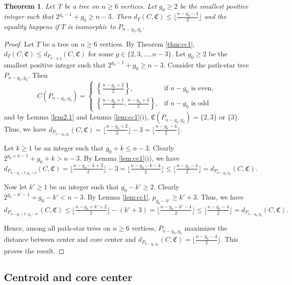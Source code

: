 \documentclass[11pt]{article}
\newtheorem{theorem}{Theorem}[section]
\begin{document}
\begin{theorem}\label{thm:cc2}
Let T be a tree on $n\geq 6$ vertices. Let $g_0\geq 2$ be the smallest positive integer such that $2^{g_0-1}+g_0\geq n-3$. Then  $d_T(C,\mathfrak{C})\leq \lfloor \frac{n-g_0-4}{2} \rfloor$ and the equality happens if $T$ is isomorphic to $P_{n-g_0,g_0}$.
\end{theorem}
\begin{proof}
Let $T$ be a tree on $n\geq 6$ vertices. By Theorem \ref{thm:cc1}, $d_T(C,\mathfrak{C})\leq d_{P_{n-g,g}}(C,\mathfrak{C})$ for some $g\in \{2,3,\ldots,n-3\}$.  
Let $g_0\geq 2$ be the smallest positive integer such that $2^{g_0-1}+g_0\geq n-3$. Consider the path-star tree $P_{n-g_0,g_0}$. Then 
\begin{equation*}
C(P_{n - g_0, g_0}) =
\begin{cases}
\left\{\frac{n - g_0 + 2}{2}\right\}, &\text{if $n - g_0$ is even,}\\
\left\{\frac{n - g_0 + 1}{2}, \frac{n - g_0 + 3}{2}\right\}, &\text{if $n - g_0$ is odd}
\end{cases}
\end{equation*}
 and by Lemma \ref{lem2.1} and Lemma \ref{lem:cc1}(i), $\mathfrak{C}(P_{n-g_0,g_0})=\{2,3\}$ or $\{3\}$. Thus, we have  $d_{P_{n - g_0, g_0}}(C,\mathfrak{C})=\lfloor \frac{n - g_0 + 2}{2}\rfloor-3=\lfloor\frac{n - g_0 -4}{2}\rfloor$.
 
Let $k\geq 1$ be an integer such that $g_0+k\leq n-3$. Clearly $2^{g_0+k-1}+g_0+k> n-3$. By Lemma \ref{lem:cc1}(i), we have $d_{P_{n - g_0-k, g_0+k}}(C,\mathfrak{C})=\lfloor \frac{n - g_0-k + 2}{2}\rfloor-3=\lfloor\frac{n - g_0 -k-4}{2}\rfloor \leq \lfloor\frac{n - g_0 -4}{2}\rfloor= d_{P_{n - g_0, g_0}}(C,\mathfrak{C}).$

Now let $k'\geq 1$ be an integer such that $g_0-k'\geq 2$. Clearly $2^{g_0-k'-1}+g_0-k'< n-3$. By Lemma \ref{lem:cc1}, $ p_{g_0-k'}\geq k'+3$. Thus, we have $d_{P_{n - g_0+k', g_0-k'}}(C,\mathfrak{C})\leq \lfloor \frac{n - g_0+k' + 2}{2}\rfloor-(k'+3)=\lfloor\frac{n - g_0 -k'-4}{2}\rfloor \leq \lfloor\frac{n - g_0 -4}{2}\rfloor= d_{P_{n - g_0, g_0}}(C,\mathfrak{C}).$ 

Hence, among all path-star trees on $n\geq 6$ vertices, $P_{n - g_0, g_0}$ maximizes the distance between center and core center and $d_{P_{n - g_0, g_0}}(C,\mathfrak{C})= \lfloor \frac{n-g_0-4}{2} \rfloor$. This proves the result.
\end{proof}


\subsection{Centroid and core center}
\end{document}
